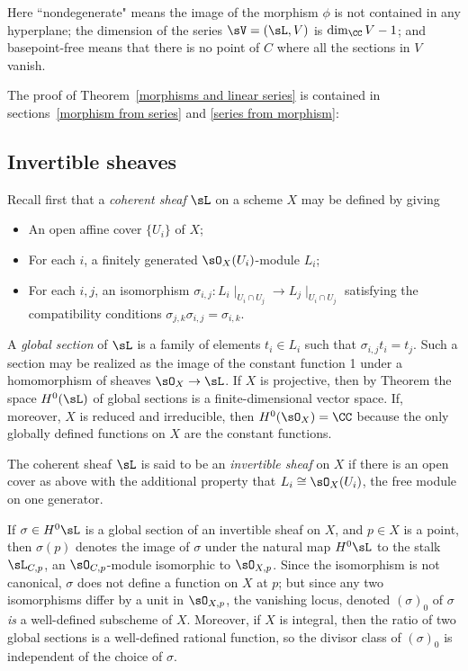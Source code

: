 Here ``nondegenerate" means the image of the morphism $\phi$ is not contained in any hyperplane; the dimension of the series
 $\sV  = (\sL, V)$ is $\dim_\CC V -1$; and basepoint-free means that there is no point of $C$ where all the sections in $V$
vanish.

The proof of Theorem~\ref{morphisms and linear series} is contained in sections~\ref{morphism from series}
and \ref{series from morphism}:


\subsection{Invertible sheaves}\label{Invertible sheaves}

Recall first that a \emph{coherent sheaf} $\sL$ on a scheme $X$ may be defined by
giving 
\begin{itemize}
 \item An open affine cover $\{U_{i}\}$ of $X$; 
 \item For each $i$, a finitely generated $\sO_{X}(U_{i})$-module $L_{i}$;
 \item For each $i,j$, an isomorphism $\sigma_{i,j}: L_{i}\mid_{U_{i}\cap U_{j}} \to L_{j}\mid_{U_{i}\cap U_{j}}$
 satisfying the compatibility conditions $\sigma_{j,k}\sigma_{i,j} = \sigma_{i,k}$. 
 \end{itemize}

A \emph{global section} of $\sL$ is a family of elements $t_{i}\in L_{i}$ such that 
$\sigma_{i,j} t_{i} = t_{j}$. Such a section may be realized as the image of the constant function 1 under
a homomorphism of sheaves $\sO_{X} \to \sL$. If $X$ is projective, then 
by Theorem \cite[Thm III.5.2]{H} the space $H^{0}(\sL)$  of global sections is
a finite-dimensional vector space. If, moreover, $X$ is reduced and irreducible, then $H^{0}(\sO_{X}) = \CC$ because the only globally defined
functions on $X$ are the constant functions.

The coherent sheaf $\sL$ is said to be an \emph{invertible sheaf} on $X$ if there is an open cover as above with the additional property
that $L_{i} \cong \sO_X(U_{i})$, the free module on one generator. 

If $\sigma \in H^0\sL$ is a global section of an invertible sheaf
on $X$, and $p\in X$ is a point, then $\sigma(p)$ denotes the image of $\sigma$ under the natural map $H^0\sL$ to the stalk $\sL_{C,p}$, an $\sO_{C,p}$-module isomorphic to $\sO_{X,p}$. Since the isomorphism is not canonical, $\sigma$ does not define a function on $X$ at $p$; but since any two isomorphisms
differ by a unit in $\sO_{X,p}$, the vanishing locus, denoted $(\sigma)_0$ of $\sigma$ \emph{is} a well-defined subscheme of $X$. Moreover, if $X$ is integral, then the ratio of two global sections is a well-defined rational function, so the divisor class of 
$(\sigma)_0$ is independent of the choice of $\sigma$.

